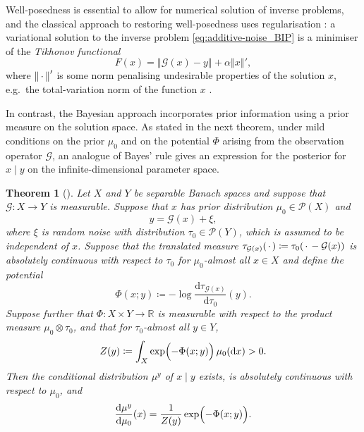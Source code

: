 \documentclass[11pt]{article}
\newcommand*{\defeq}{\coloneqq}
\newcommand*{\prob}[1]{\mathscr{P}(#1)}
\newcommand*{\quark}{\setbox0\hbox{$x$}\hbox to\wd0{\hss$\cdot$\hss}}
\newcommand*{\rd}{\mathrm{d}}
\newcommand*{\Reals}{\mathbb{R}}
\theoremstyle{plain}
\newtheorem{theorem}{Theorem}[section]
\theoremstyle{definition}
\newcommand{\Norm}[1]{\left\Vert #1 \right\Vert}
\numberwithin{equation}{section}
\numberwithin{figure}{section}
\numberwithin{table}{section}
\begin{document}
Well-posedness is essential to allow for numerical solution of inverse problems, and the classical approach to restoring well-posedness uses regularisation \citep[see e.g.][]{BenningBurger2018}:
a variational solution to the inverse problem \eqref{eq:additive-noise_BIP} is a minimiser of the \emph{Tikhonov functional}
\begin{equation*}
	F(x) = \Norm{\mathcal{G}(x) - y} + \alpha \Norm{x}',
\end{equation*}
where $\Norm{\quark}'$ is some norm penalising undesirable properties of the solution $x$, e.g.\ the total-variation norm of the function $x$ \citep{RudinOsherFatemi1992}.

In contrast, the Bayesian approach incorporates prior information using a prior measure on the solution space.
As stated in the next theorem, under mild conditions on the prior $\mu_{0}$ and on the potential $\Phi$ arising from the observation operator $\mathcal{G}$, an analogue of Bayes' rule gives an expression for the posterior for $x \mid y$ on the infinite-dimensional parameter space.

\begin{theorem}[{\citealp[Theorem~14]{DashtiStuart2017}}]
	\label{thm:Bayes}
	Let $X$ and $Y$ be separable Banach spaces and suppose that $\mathcal{G} \colon X \to Y$ is measurable.
	Suppose that $x$ has prior distribution $\mu_{0} \in \prob{X}$ and
	\begin{equation*}
		y = \mathcal{G}(x) + \xi,
	\end{equation*}
	where $\xi$ is random noise with distribution $\tau_{0} \in \prob{Y}$, which is assumed to be independent of $x$.
	Suppose that the translated measure $\tau_{\mathcal{G}(x)}(\quark) \defeq \tau_{0}(\quark - \mathcal{G}(x))$ is absolutely continuous with respect to $\tau_{0}$ for $\mu_{0}$-almost all $x \in X$ and define the potential
	\begin{equation*}
		\Phi(x; y) \defeq -\log \frac{\rd \tau_{\mathcal{G}(x)}}{\rd \tau_{0}}(y).
	\end{equation*}
	Suppose further that $\Phi \colon X \times Y \to \Reals$ is measurable with respect to the product measure $\mu_{0} \otimes \tau_{0}$, and that for $\tau_{0}$-almost all $y \in Y$,
	\begin{equation} \label{eq:normalisation_constant}
		Z(y) \defeq \int_{X} \exp\Bigl(-\Phi(x; y)\Bigr) \,\mu_{0}(\rd x) > 0.
	\end{equation}
	Then the conditional distribution $\mu^{y}$ of $x \mid y$ exists, is absolutely continuous with respect to $\mu_{0}$, and
	\begin{equation} \label{eq:posterior_density_BIP}
		\frac{\rd \mu^{y}}{\rd \mu_{0}}(x) = \frac{1}{Z(y)} \exp\Bigl( -\Phi(x; y) \Bigr).
	\end{equation}
\end{theorem}
\end{document}
